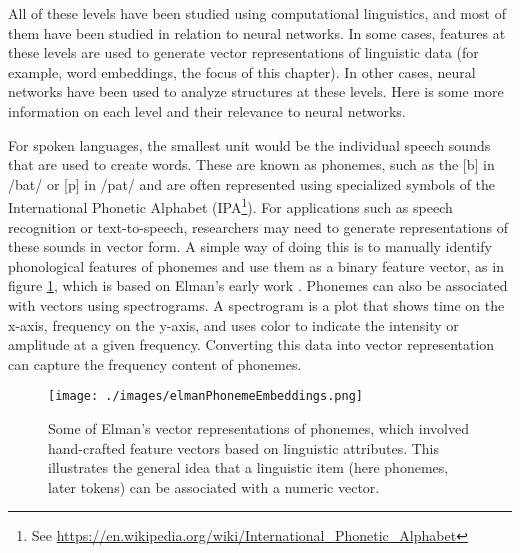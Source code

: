 All of these levels have been studied using computational linguistics, and most of them have been studied in relation to neural networks. In some cases, features at these levels are used to generate vector representations of linguistic data (for example, word embeddings, the focus of this chapter). In other cases, neural networks have been used to analyze structures at these levels. Here is some more information on each level and their relevance to neural networks.

For spoken languages, the smallest unit would be the individual speech sounds that are used to create words. These are known as phonemes, such as the [b] in /bat/ or [p] in /pat/ and are often represented using specialized symbols of the International Phonetic Alphabet (IPA\footnote{See \url{https://en.wikipedia.org/wiki/International_Phonetic_Alphabet}}). For applications such as speech recognition or text-to-speech, researchers may need to generate representations of these sounds in vector form.  A simple way of doing this is to manually identify phonological features of phonemes and use them as a binary feature vector, as in figure  \ref{elmanWordEmbeddings}, which is based on Elman's early work \cite{elman1990finding}. Phonemes can also be associated with vectors using spectrograms. A spectrogram is a plot that shows time on the x-axis, frequency on the y-axis, and uses color to indicate the intensity or amplitude at a given frequency. Converting this data into vector representation can capture the frequency content of phonemes.

\begin{figure}[h]
\centering
\texttt{[image: ./images/elmanPhonemeEmbeddings.png]}
\caption[From \cite{elman1990finding}.]{Some of Elman's vector representations of phonemes, which involved hand-crafted feature vectors based on linguistic attributes. This illustrates the general idea that a linguistic item (here phonemes, later tokens) can be associated with a numeric vector. }
\label{elmanWordEmbeddings}
\end{figure}

